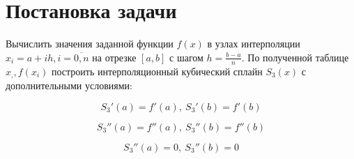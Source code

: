 \documentclass[12pt, a4paper]{article}
\begin{document}
	
	\begin{titlepage}
	\end{titlepage}
	
	\tableofcontents
	
	\section{Постановка задачи}
	
	Вычислить значения заданной функции $f(x)$ в узлах интерполяции 
	$x_i = a+ih, i = \overline{0,n}$ на отрезке $[a,b]$ с шагом $h = \frac{b-a}{n}$.
	По полученной таблице ${x_,, f(x_i)}$ построить интерполяционный кубический сплайн 
	$S_3(x)$ с дополнительными условиями:
	
	\begin{equation}
	S_3'(a) = f'(a),\ S_3'(b) = f'(b)
	\label{eq:condition_1}
	\end{equation}
	
	\begin{equation}
	S_3''(a) = f''(a),\ S_3''(b) = f''(b)
	\label{eq:condition_2}
	\end{equation}
	
	\begin{equation}
	S_3''(a)=0,\ S_3''(b) = 0
	\label{eq:condition_3}
	\end{equation}
	
\end{document}

